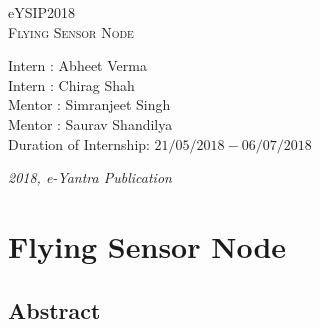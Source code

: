 \documentclass[a4paper,12pt,oneside]{book}
\begin{document}
\begin{titlepage}
\raggedright
{\Large eYSIP2018\\[1cm]}
{\Huge\scshape Flying Sensor Node \\[.1in]}
\vfill
\begin{flushright}
{\large \hspace{0.05cm} Intern : Abheet Verma \\}
{\large Intern \hspace{0.05cm} : Chirag Shah \\}
\hfill \linebreak
{\large Mentor : Simranjeet Singh \\}
{\large Mentor : Saurav Shandilya \\}
\hfill \linebreak
{\large Duration of Internship: $ 21/05/2018-06/07/2018 $ \\}
\end{flushright}

{\itshape 2018, e-Yantra Publication}
\end{titlepage}

\chapter[Project Tag]{Flying Sensor Node}
\section*{Abstract}
\end{document}
